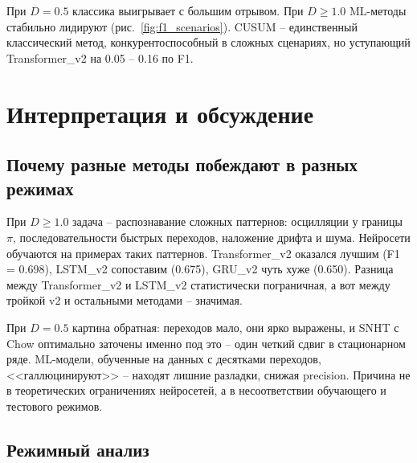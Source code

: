 \documentclass[12pt,a4paper]{article}
\begin{document}
При $D = 0.5$ классика выигрывает с большим отрывом. При $D \geq 1.0$ ML-методы стабильно лидируют (рис.~\ref{fig:f1_scenarios}). CUSUM  -- единственный классический метод, конкурентоспособный в сложных сценариях, но уступающий Transformer\_v2 на 0.05 -- 0.16 по F1.

\section{Интерпретация и обсуждение}

\subsection{Почему разные методы побеждают в разных режимах}

При $D \geq 1.0$ задача -- распознавание сложных паттернов: осцилляции у границы $\pi$, последовательности быстрых переходов, наложение дрифта и шума. Нейросети обучаются на примерах таких паттернов. Transformer\_v2 оказался лучшим (F1 = 0.698), LSTM\_v2 сопоставим (0.675), GRU\_v2 чуть хуже (0.650). Разница между Transformer\_v2 и LSTM\_v2 статистически пограничная, а вот между тройкой v2 и остальными методами -- значимая.

При $D = 0.5$ картина обратная: переходов мало, они ярко выражены, и SNHT с Chow оптимально заточены именно под это -- один четкий сдвиг в стационарном ряде. ML-модели, обученные на данных с десятками переходов, <<галлюцинируют>> -- находят лишние разладки, снижая precision. Причина не в теоретических ограничениях нейросетей, а в несоответствии обучающего и тестового режимов.

\subsection{Режимный анализ}
\end{document}
